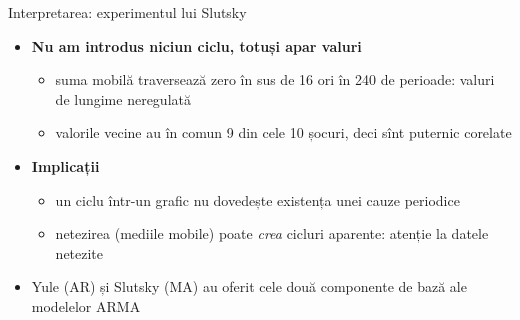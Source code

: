 \begin{frame}{Interpretarea: experimentul lui Slutsky}
\itemsize{\small}
\begin{itemize}
    \item \textbf{Nu am introdus niciun ciclu, totuși apar valuri}
    \begin{itemize}
        \item suma mobilă traversează zero în sus de 16 ori în 240 de perioade: valuri de lungime neregulată
        \item valorile vecine au în comun 9 din cele 10 șocuri, deci sînt puternic corelate
    \end{itemize}
    \item \textbf{Implicații}
    \begin{itemize}
        \item un ciclu într-un grafic nu dovedește existența unei cauze periodice
        \item netezirea (mediile mobile) poate \emph{crea} cicluri aparente: atenție la datele netezite
    \end{itemize}
    \item Yule (AR) și Slutsky (MA) au oferit cele două componente de bază ale modelelor ARMA
\end{itemize}
\end{frame}

